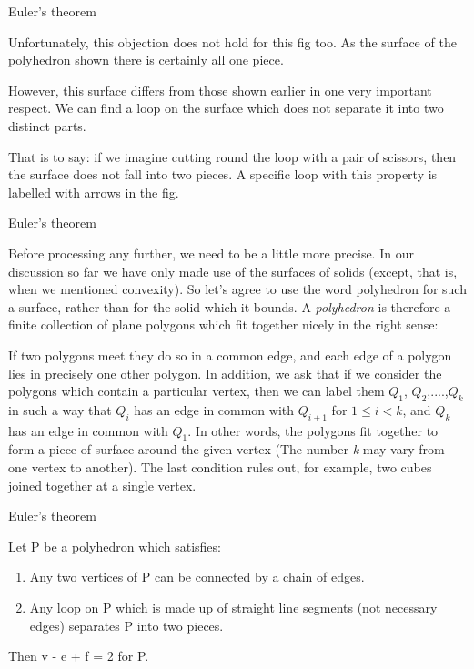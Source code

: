 \documentclass{beamer}
\begin{document}
\begin{frame}{Euler's theorem}
  \begin{block}{}
    Unfortunately, this objection does not hold for this fig too. As the surface of the polyhedron shown there is certainly all one piece.
  \end{block}
  \begin{block}{}
    However, this surface differs from those shown earlier in one very important respect. We can find a loop on the surface which does not separate it into two distinct parts.
  \end{block}
  \begin{block}{}
    That is to say: if we imagine cutting round the loop with a pair of scissors, then the surface does not fall into two pieces. A specific loop with this property is labelled with arrows in the fig.
  \end{block}
\end{frame}

\begin{frame}{Euler's theorem}
  \begin{block}{}
    Before processing any further, we need to be a little more precise. In our discussion so far we have only made use of the surfaces of solids (except, that is, when we mentioned convexity). So let's agree to use the word polyhedron for such a surface, rather than for the solid which it bounds. A \textsl{polyhedron} is therefore a finite collection of plane polygons which fit together nicely in the right sense:
  \end{block}
  \begin{block}{}
    If two polygons meet they do so in a common edge, and each edge of a polygon lies in precisely one other polygon. In addition, we ask that if we consider the polygons which contain a particular vertex, then we can label them $Q_1$, $Q_2$,....,$Q_k$ in such a way that $Q_i$ has an edge in common with $Q_{i+1}$ for $1 \leq i < k$, and $Q_k$ has an edge in common with $Q_1$. In other words, the polygons fit together to form a piece of surface around the given vertex (The number \textsl{k} may vary from one vertex to another). The last condition rules out, for example, two cubes joined together at a single vertex.
  \end{block}
\end{frame}

\begin{frame}{Euler's theorem}
  \begin{theorem}
    Let P be a polyhedron which satisfies:
    \begin{enumerate}[label={(\alph*)}]
    \item Any two vertices of P can be connected by a chain of edges.
    \item Any loop on P which is made up of straight line segments (not necessary edges) separates P into two pieces.
    \end{enumerate}
    Then v - e + f = 2 for P.
  \end{theorem}
\end{frame}
\end{document}
